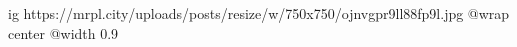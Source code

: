  
 
 
 
 

\ifcmt
  ig https://mrpl.city/uploads/posts/resize/w/750x750/ojnvgpr9ll88fp9l.jpg
  @wrap center
  @width 0.9
\fi
